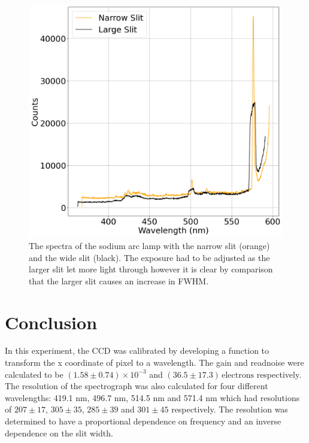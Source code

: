 \documentclass[a4paper,12pt,twocolumn]{article}
\begin{document}
		\begin{figure}
			\includegraphics[width=\columnwidth]{slitWidth.png}
			\captionsetup{font=scriptsize}
			\caption{The spectra of the sodium arc lamp with the narrow slit (orange) and the wide slit (black). The exposure had to be adjusted as the larger slit let more light through however it is clear by comparison that the larger slit causes an increase in FWHM.}
			\label{fig:slitWidth}
		\end{figure}
		
	\section{Conclusion}
		In this experiment, the CCD was calibrated by developing a function to transform the x coordinate of pixel to a wavelength. The gain and readnoise were calculated to be $(1.58 \pm 0.74)\times 10^{-3}$ and $(36.5 \pm 17.3) \,\text{electrons}$ respectively. The resolution of the spectrograph was also calculated for four different wavelengths: 419.1 nm, 496.7 nm, 514.5 nm and 571.4 nm which had resolutions of $207\pm17$, $305\pm35$, $285\pm39$ and $301\pm45$ respectively. The resolution was determined to have a proportional dependence on frequency and an inverse dependence on the slit width.
	
	\printbibliography
\end{document}
